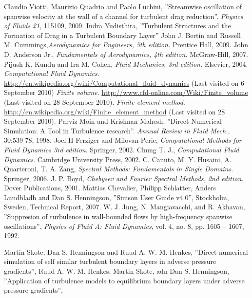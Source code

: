 \documentclass[a4paper,12pt]{report}
\begin{document}
\begin{thebibliography}{2}
 Claudio Viotti, Maurizio Quadrio and Paolo Luchini, ''Streamwise oscillation of spanwise velocity at the wall of a channel for turbulent drag reduction''. \emph{Physics of Fluids 21}, 115109, 2009.
 Indra Yudisthira, ''Turbulent Structures and the Formation of Drag in a Turbulent Boundary Layer''
 John J. Bertin and Russell M. Cummings,\emph{Aerodynamics for Engineers, 5th edition.} Prentice Hall, 2009.
 John D. Anderson Jr., \emph{Fundamentals of Aerodynamics, 4th edition.} McGraw-Hill, 2007.  
 Pijush K. Kundu and Ira M. Cohen, \emph{Fluid Mechanics, 3rd edition.} Elsevier, 2004.
 \emph{Computational Fluid Dynamics}. \url{http://en.wikipedia.org/wiki/Computational_fluid_dynamics} (Last visited on 6 September 2010)
 \emph{Finite volume}. \url{http://www.cfd-online.com/Wiki/Finite_volume} (Last visited on 28 September 2010).
 \emph{Finite element method}. \url{http://en.wikipedia.org/wiki/Finite_element_method} (Last visited on 28 September 2010).
 Parviz Moin and Krishnan Mahesh. ''Direct Numerical Simulation: A Tool in Turbulence research''. \emph{Annual Review in Fluid Mech.}, 30:539-78, 1998.
 Joel H Ferziger and Milovan Peric, \emph{Computational Methods for Fluid Dynamics 3rd edition}. Springer, 2002.
 Chung T. J., \emph{Computational Fluid Dynamics}. Cambridge University Press, 2002.
 C. Canuto, M. Y. Husaini, A. Quarteroni, T. A. Zang, \emph{Spectral Methods: Fundamentals in Single Domains}. Springer, 2006.
 J. P. Boyd, \emph{Chebysev and Fourier Spectral Methods, 2nd edition}. Dover Publications, 2001.
 Mattias Chevalier, Philipp Schlatter, Anders Lundbladh and Dan S. Henningson, ''Simson User Guide v4.0'', Stockholm, Sweden, Technical Report, 2007.
 W. J. Jung, N. Mangiavacchi, and R. Akhavan, ''Suppresion of turbulence in wall-bounded flows by high-frequency spanwise oscillations'', \emph{Physics of Fluid A: Fluid Dynamics}, vol. 4, no. 8, pp. 1605 -- 1607, 1992. 

 Martin Skote, Dan S. Henningson and Ruud A. W. M. Henkes, ''Direct numerical simulation of self similar turbulent boundary layers in adverse pressure gradients'', \emph{}
 Ruud A. W. M. Henkes, Martin Skote, adn Dan S. Henningson, ''Application of turbulence models to equilibrium boundary layers under adverse pressure gradients'', \emph{}

\end{thebibliography}

\appendix


\end{document}

